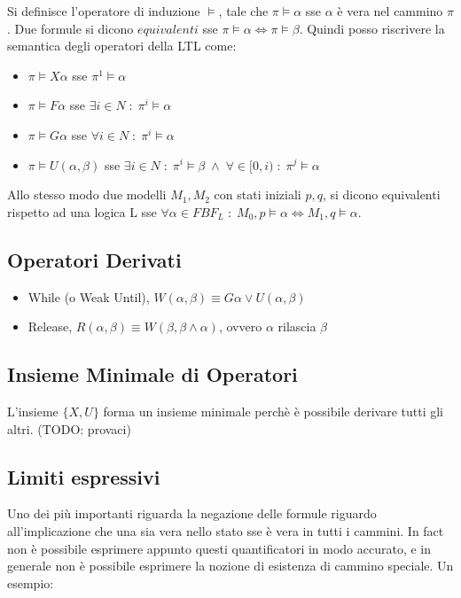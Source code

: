 Si definisce l'operatore di induzione $\models$, tale che $\pi \models \alpha$ sse $\alpha$ \`e vera nel cammino $\pi$.
Due formule si dicono $equivalenti$ sse $\pi \models \alpha \Leftrightarrow \pi \models \beta$.
Quindi posso riscrivere la semantica degli operatori della LTL come:

\begin{itemize}
    \item $\pi \models X\alpha$ sse $\pi^{1} \models \alpha$
    \item $\pi \models F\alpha$ sse $\exists i \in N \; : \; \pi^{i} \models \alpha$
    \item $\pi \models G\alpha$ sse $\forall i \in N \; : \; \pi^{i} \models \alpha$
    \item $\pi \models U(\alpha, \beta)$ sse $\exists i \in N \; : \; \pi^{i} \models \beta \; \land \; \forall \in [0, i)\; : \; \pi^{j} \models \alpha$
\end{itemize}

Allo stesso modo due modelli $M_1, M_2$ con stati iniziali $p, q$, si dicono equivalenti rispetto ad una logica L sse $\forall \alpha \in FBF_L \; : \; M_0,p \models \alpha \Leftrightarrow M_1,q \models \alpha$.

\subsection{Operatori Derivati}

\begin{itemize}
  \item While (o Weak Until), $W(\alpha, \beta) \equiv G\alpha \lor U(\alpha, \beta)$
  \item Release, $R(\alpha, \beta) \equiv W(\beta, \beta \land \alpha)$, ovvero $\alpha$ rilascia $\beta$
\end{itemize}

\subsection{Insieme Minimale di Operatori}

L'insieme $\{X, U\}$ forma un insieme minimale perch\`e \`e possibile derivare tutti gli altri. (TODO: provaci)

\subsection{Limiti espressivi}

Uno dei pi\`u importanti riguarda la negazione delle formule riguardo all'implicazione che una sia vera nello stato sse \`e vera in tutti i cammini. In fact non \`e possibile esprimere appunto questi quantificatori in modo accurato, e in generale non \`e possibile esprimere la nozione di esistenza di cammino speciale. Un esempio:


